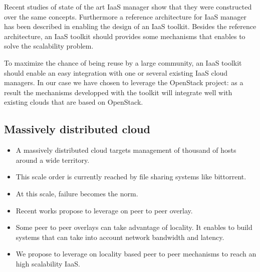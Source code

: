 Recent studies of state of the art IaaS manager \cite{peng:2009} show that they
were constructed over the same concepts. Furthermore a reference architecture 
for IaaS manager has been described in \cite{moreno2012iaas} enabling the design
of an IaaS toolkit. Besides the reference architecture, an IaaS toolkit should
provides some mechanisms that enables to solve the scalability problem.

To maximize the chance of being reuse by a large community, an IaaS toolkit 
should enable an easy integration with one or several existing IaaS cloud
managers. In our case we have chosen to leverage the OpenStack project: as a 
result the mechanisms developped with the toolkit will integrate well with 
existing clouds that are based on OpenStack.



\subsection{Massively distributed cloud}

\begin{itemize}

	\item A massively distributed cloud targets management of thousand of hosts 
	around a wide territory.

	\item This scale order is currently reached by file sharing systems like 
	bittorrent.

	\item At this scale, failure becomes the norm.

	\item Recent works propose to leverage on peer to peer overlay.

	\item Some peer to peer overlays can take advantage of locality. It enables
	to build systems that can take into account network bandwidth and latency.

	\item We propose to leverage on locality based peer to peer mechanisms to 
	reach an high scalability IaaS.

\end{itemize}
